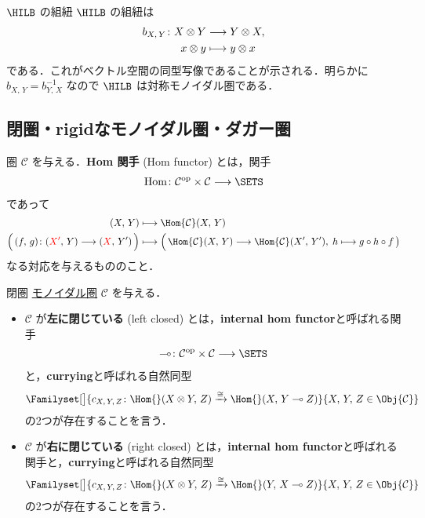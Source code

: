 \documentclass[TQFT_main]{subfiles}
\begin{document}
\begin{myexample}[label=ex:Hilb-braided]{$\HILB$ の組紐}
    $\HILB$ の組紐は
    \begin{align}
        b_{X,\, Y} \colon X \otimes Y &\longrightarrow Y \otimes X, \\
        x \otimes y &\longmapsto y \otimes x
    \end{align}
    である．これがベクトル空間の同型写像であることが示される．明らかに $b_{X,\, Y} = b_{Y,\, X}^{-1}$ なので $\HILB$ は対称モノイダル圏である．
\end{myexample}

\subsection{閉圏・rigidなモノイダル圏・ダガー圏}

圏 $\mathcal{C}$ を与える．\textbf{Hom 関手} (Hom functor) とは，関手
\begin{align}
    \mathrm{Hom}{} \colon \mathcal{C}^{\mathrm{op}} \times \mathcal{C} \lto \SETS
\end{align}
であって
\begin{align}
    (X,\, Y) &\lmto \Hom{\mathcal{C}} (X,\, Y) \\
    \Bigl(\, (f,\, g) \colon (\textcolor{red}{X'},\, Y) \lto (\textcolor{red}{X},\, Y')\, \Bigr)  &\lmto \Bigl(\, \Hom{\mathcal{C}}(X,\, Y) \lto \Hom{\mathcal{C}}(X',\, Y'),\; h \lmto g \circ h \circ f \,\bigr) 
\end{align}
なる対応を与えるもののこと．

\begin{mydef}[label=def:closed-monoidal,breakable]{閉圏}
    \hyperref[def:monoidal-category]{モノイダル圏} $\mathcal{C}$ を与える．
    \begin{itemize}
        \item $\mathcal{C}$ が\textbf{左に閉じている} (left closed) とは，\textbf{internal hom functor}と呼ばれる関手
        \begin{align}
            \multimap \colon \mathcal{C}^{\mathrm{op}} \times \mathcal{C} \lto \SETS
        \end{align}
        と，\textbf{currying}と呼ばれる自然同型
        \begin{align}
            \Familyset[\big]{c_{X,\, Y,\, Z} \colon \Hom{}(X \otimes Y,\, Z) \xrightarrow{\cong} \Hom{}(X,\, Y \multimap Z)}{X,\, Y,\, Z \in \Obj{\mathcal{C}}}
        \end{align}
        の2つが存在することを言う．
        \item $\mathcal{C}$ が\textbf{右に閉じている} (right closed) とは，\textbf{internal hom functor}と呼ばれる関手と，\textbf{currying}と呼ばれる自然同型
        \begin{align}
            \Familyset[\big]{c_{X,\, Y,\, Z} \colon \Hom{}(X \otimes Y,\, Z) \xrightarrow{\cong} \Hom{}(Y,\, X \multimap Z)}{X,\, Y,\, Z \in \Obj{\mathcal{C}}}
        \end{align}
        の2つが存在することを言う．
    \end{itemize}
\end{mydef}
\end{document}

